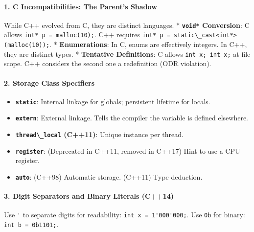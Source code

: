 \hypertarget{c-incompatibilities-the-parents-shadow}{%
\paragraph{1. C Incompatibilities: The Parent's
Shadow}\label{c-incompatibilities-the-parents-shadow}}

While C++ evolved from C, they are distinct languages. *
\textbf{\passthrough{\lstinline!void*!} Conversion}: C allows
\passthrough{\lstinline!int* p = malloc(10);!}. C++ requires
\passthrough{\lstinline!int* p = static\_cast<int*>(malloc(10));!}. *
\textbf{Enumerations}: In C, enums are effectively integers. In C++,
they are distinct types. * \textbf{Tentative Definitions}: C allows
\passthrough{\lstinline!int x; int x;!} at file scope. C++ considers the
second one a redefinition (ODR violation).

\hypertarget{storage-class-specifiers}{%
\paragraph{2. Storage Class Specifiers}\label{storage-class-specifiers}}

\begin{itemize}
\tightlist
\item
  \textbf{\passthrough{\lstinline!static!}}: Internal linkage for
  globals; persistent lifetime for locals.
\item
  \textbf{\passthrough{\lstinline!extern!}}: External linkage. Tells the
  compiler the variable is defined elsewhere.
\item
  \textbf{\passthrough{\lstinline!thread\_local!} (C++11)}: Unique
  instance per thread.
\item
  \textbf{\passthrough{\lstinline!register!}}: (Deprecated in C++11,
  removed in C++17) Hint to use a CPU register.
\item
  \textbf{\passthrough{\lstinline!auto!}}: (C++98) Automatic storage.
  (C++11) Type deduction.
\end{itemize}

\hypertarget{digit-separators-and-binary-literals-c14}{%
\paragraph{3. Digit Separators and Binary Literals
(C++14)}\label{digit-separators-and-binary-literals-c14}}

Use \passthrough{\lstinline!'!} to separate digits for readability:
\passthrough{\lstinline!int x = 1'000'000;!}. Use
\passthrough{\lstinline!0b!} for binary:
\passthrough{\lstinline!int b = 0b1101;!}.


